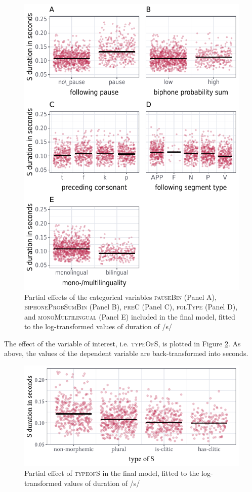 \begin{figure}
    \centering
    \includegraphics[]{figures/fig4.5.pdf}
    \caption{Partial effects of the categorical variables \textsc{pauseBin} (Panel A), \textsc{biphoneProbSumBin} (Panel B), \textsc{preC} (Panel C), \textsc{folType} (Panel D), and \textsc{monoMultilingual} (Panel E) included in the final model, fitted to the log-transformed values of duration of /s/}
    \label{fig:4_5}
\end{figure}

The effect of the variable of interest, i.e. \textsc{typeOfS}, is plotted in Figure \ref{fig:4_6}. As above, the values of the dependent variable are back-transformed into seconds.

\begin{figure}
    \centering
    \includegraphics[width=1\textwidth]{figures/fig4.6.pdf}
    \caption{Partial effect of \textsc{typeofS} in the final model, fitted to the log-transformed values of duration of /s/}
    \label{fig:4_6}
\end{figure}

